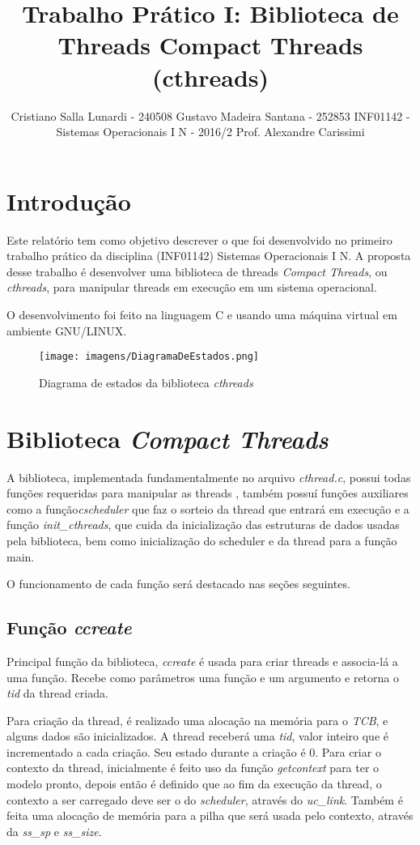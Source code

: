 \documentclass{article}
\title{Trabalho Prático I: Biblioteca de Threads Compact Threads (cthreads)}
\author{Cristiano Salla Lunardi - 240508 \cr
Gustavo Madeira Santana - 252853 \cr\cr
INF01142 - Sistemas Operacionais I N - 2016/2\cr\cr
Prof. Alexandre Carissimi}
\date{}
\begin{document}
\maketitle

\section{Introdução}
Este relatório tem como objetivo descrever o que foi desenvolvido no primeiro trabalho prático da disciplina (INF01142) Sistemas Operacionais I N. A proposta desse trabalho é desenvolver uma biblioteca de threads \textit{Compact Threads}, ou \textit{cthreads}, para manipular threads em execução em um sistema operacional.

O desenvolvimento foi feito na linguagem C e usando uma máquina virtual em ambiente GNU/LINUX.

\begin{figure}[b]
    \centering
    \texttt{[image: imagens/DiagramaDeEstados.png]}
    \caption{Diagrama de estados da biblioteca \textit{cthreads}}
    \label{fig:sym4}
\end{figure}

\section{Biblioteca \textit{Compact Threads}}
A biblioteca, implementada fundamentalmente no arquivo \textit{cthread.c}, possui todas funções requeridas para manipular as threads \footnotemark, também possuí funções auxiliares como a função\textit{cscheduler} que faz o sorteio da thread que entrará em execução e a função \textit{init\_cthreads}, que cuida da inicialização das estruturas de dados usadas pela biblioteca, bem como inicialização do scheduler e da thread para a função main.

O funcionamento de cada função será destacado nas seções seguintes.

\subsection{Função \textit{ccreate}}
Principal função da biblioteca, \textit{ccreate} é usada para criar threads e associa-lá a uma função. Recebe como parâmetros uma função e um argumento e retorna o \textit{tid} da thread criada.

Para criação da thread, é realizado uma alocação na memória para o \textit{TCB}, e alguns dados são inicializados. A thread receberá uma \textit{tid}, valor inteiro que é incrementado a cada criação. Seu estado durante a criação é 0\footnotemark. Para criar o contexto da thread, inicialmente é feito uso da função \textit{getcontext} para ter o modelo pronto, depois então é definido que ao fim da execução da thread, o contexto a ser carregado deve ser o do \textit{scheduler}, através do \textit{uc\_link}. Também é feita uma alocação de memória para a pilha que será usada pelo contexto, através da \textit{ss\_sp} e \textit{ss\_size}.
\end{document}
